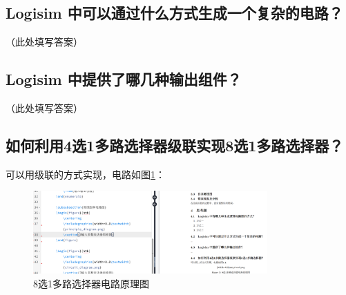 \documentclass{article}
\begin{document}
\subsection{Logisim 中可以通过什么方式生成一个复杂的电路？}
（此处填写答案）

\subsection{Logisim 中提供了哪几种输出组件？}
（此处填写答案）

\subsection{如何利用4选1多路选择器级联实现8选1多路选择器？}
可以用级联的方式实现，电路如图\ref{8-1MUX}：

\begin{figure}[htb]
  \centering
  \includegraphics[width=0.8\textwidth]{image.png} %
  \caption{8选1多路选择器电路原理图}
  \label{8-1MUX}
\end{figure}
\end{document}
